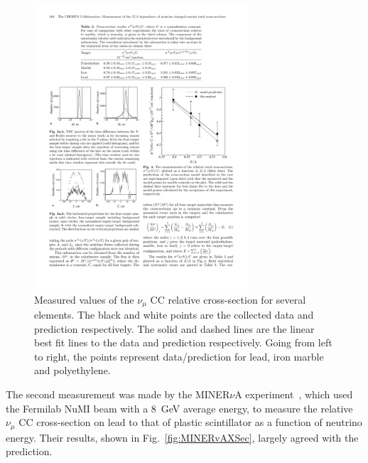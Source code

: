 \begin{figure}%
  \centering
  \includegraphics[width=8cm]{images/neutrino_interactions/CHORUS_XSec.pdf}
  \caption{Measured values of the $\nu_\mu$ CC relative cross-section for several elements.  The black and white points are the collected data and prediction respectively.  The solid and dashed lines are the linear best fit lines to the data and prediction respectively.  Going from left to right, the points represent data/prediction for lead, iron marble and polyethylene.}
  \label{fig:CHORUSXSec}
\end{figure}
The second measurement was made by the MINER$\nu$A experiment~\cite{PhysRevLett.112.231801}, which used the Fermilab NuMI beam with a 8~GeV average energy, to measure the relative $\nu_\mu$ CC cross-section on lead to that of plastic scintillator as a function of neutrino energy.  Their results, shown in Fig.~\ref{fig:MINERvAXSec}, largely agreed with the prediction.
